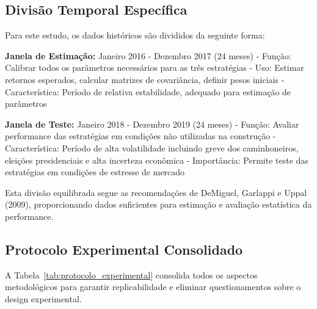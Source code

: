 \subsection{Divisão Temporal Específica}

Para este estudo, os dados históricos são divididos da seguinte forma:

\textbf{Janela de Estimação:} Janeiro 2016 - Dezembro 2017 (24 meses)
- Função: Calibrar todos os parâmetros necessários para as três estratégias
- Uso: Estimar retornos esperados, calcular matrizes de covariância, definir pesos iniciais
- Característica: Período de relativa estabilidade, adequado para estimação de parâmetros

\textbf{Janela de Teste:} Janeiro 2018 - Dezembro 2019 (24 meses)
- Função: Avaliar performance das estratégias em condições não utilizadas na construção
- Característica: Período de alta volatilidade incluindo greve dos caminhoneiros, eleições presidenciais e alta incerteza econômica
- Importância: Permite teste das estratégias em condições de estresse de mercado

Esta divisão equilibrada segue as recomendações de DeMiguel, Garlappi e Uppal (2009), proporcionando dados suficientes para estimação e avaliação estatística da performance.

\subsection{Protocolo Experimental Consolidado}

A Tabela~\ref{tab:protocolo_experimental} consolida todos os aspectos metodológicos para garantir replicabilidade e eliminar questionamentos sobre o design experimental.

